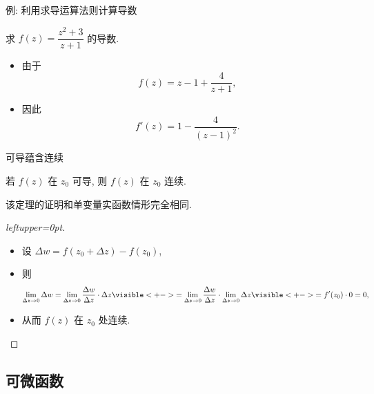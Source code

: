 \begin{frame}{例: 利用求导运算法则计算导数}
	\onslide<+->
	\begin{example}[nearnext]
		求 $f(z)=\dfrac{z^2+3}{z+1}$ 的导数.
	\end{example}
	\onslide<+->
	\begin{solution}[nearprev,leftupper=0pt]
		\begin{itemize}
			\item 由于
			\[
				f(z)=z-1+\frac4{z+1},
			\]
			\item 因此
			\[
				f'(z)=1-\frac4{(z-1)^2}.
			\]
		\end{itemize}
	\end{solution}
\end{frame}


\begin{frame}{可导蕴含连续}
	\onslide<+->
	\begin{theorem}[nearprev]
		若 $f(z)$ 在 $z_0$ 可导, 则 $f(z)$ 在 $z_0$ 连续.
	\end{theorem}
	\onslide<+->
	该定理的证明和单变量实函数情形完全相同.
	\onslide<+->
	\begin{proof}[leftupper=0pt]
		\begin{itemize}
			\item 设 $\Delta w=f(z_0+\Delta z)-f(z_0)$,
			\item 则
			\[
				\lim_{\Delta z\to 0}\Delta w
				=\lim_{\Delta z\to 0}\frac{\Delta w}{\Delta z}\cdot\Delta z
				\visible<+->{=\lim_{\Delta z\to 0}\frac{\Delta w}{\Delta z}\cdot\lim_{\Delta z\to 0}\Delta z}
				\visible<+->{=f'(z_0)\cdot 0=0,}
			\]
			\item 从而 $f(z)$ 在 $z_0$ 处连续.\qedhere
		\end{itemize}
	\end{proof}
\end{frame}


\subsection{可微函数}

